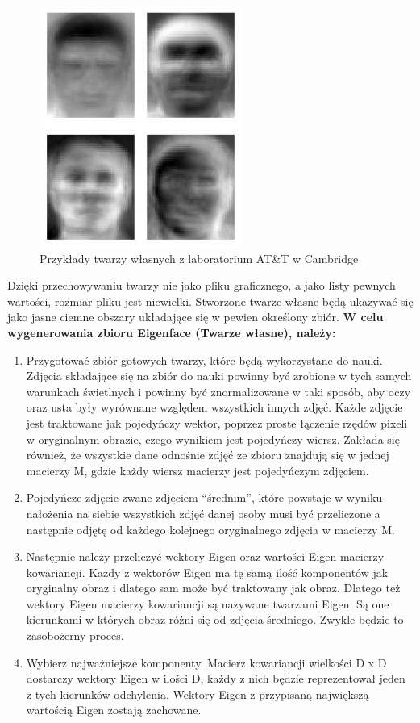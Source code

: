 \begin{figure}[h]
\centering
\includegraphics[scale=0.5]{./eigenface.jpg}
\caption[Twarze własne, przykłady]{Przykłady twarzy własnych z laboratorium AT\&T w Cambridge}
\end{figure}

Dzięki przechowywaniu twarzy nie jako pliku graficznego, a jako listy pewnych wartości, rozmiar pliku jest niewielki. Stworzone twarze własne będą ukazywać się jako jasne  ciemne obszary układające się w pewien określony zbiór.
\newpage
\noindent \textbf{W celu wygenerowania zbioru Eigenface (Twarze własne), należy:}
\begin{enumerate}
\item Przygotować zbiór gotowych twarzy, które będą wykorzystane do nauki. Zdjęcia składające się na zbiór do nauki powinny być zrobione w tych samych warunkach świetlnych i powinny być znormalizowane w taki sposób, aby oczy oraz usta były wyrównane względem wszystkich innych zdjęć. Każde zdjęcie jest traktowane jak pojedyńczy wektor, poprzez proste łączenie rzędów pixeli w oryginalnym obrazie, czego wynikiem jest pojedyńczy wiersz. Zakłada się również, że wszystkie dane odnośnie zdjęć ze zbioru znajdują się w jednej macierzy M, gdzie każdy wiersz macierzy jest pojedyńczym zdjęciem.
\item  Pojedyńcze zdjęcie zwane zdjęciem “średnim”, które powstaje w wyniku nałożenia na siebie wszystkich zdjęć danej osoby musi być przeliczone a następnie odjętę od każdego kolejnego oryginalnego zdjęcia w macierzy M.
\item  Następnie należy przeliczyć wektory Eigen oraz wartości Eigen macierzy kowariancji. Każdy z wektorów Eigen ma tę samą ilość komponentów jak oryginalny obraz i dlatego sam może być traktowany jak obraz. Dlatego też wektory Eigen macierzy kowariancji są nazywane twarzami Eigen. Są one kierunkami w których obraz różni się od zdjęcia średniego. Zwykle będzie to zasobożerny proces.
\item Wybierz najważniejsze komponenty. Macierz kowariancji wielkości D x D dostarczy wektory Eigen w ilości D, każdy z nich będzie reprezentował jeden z tych kierunków odchylenia. Wektory Eigen z przypisaną największą wartością Eigen zostają zachowane.
\end{enumerate}

